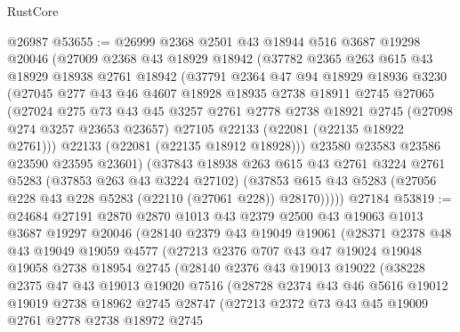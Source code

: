 \begin{lexlean}{RustCore}
\begin{coremodule}
    @26987
@53655 := @26999
    @2368
    @2501
    @43
    @18944
    @516
    @3687
    @19298
    @20046
    (@27009
      @2368
      @43
      @18929
      @18942
      (@37782
        @2365
        @263
        @615
        @43
        @18929
        @18938
        @2761
        @18942
        (@37791
          @2364
          @47
          @94
          @18929
          @18936
          @3230
          (@27045
            @277
            @43
            @46
            @4607
            @18928
            @18935
            @2738
            @18911
            @2745
            @27065
            (@27024
              @275
              @73
              @43
              @45
              @3257
              @2761
              @2778
              @2738
              @18921
              @2745
              (@27098 @274 @3257 @23653 @23657)
              @27105
              @22133
              (@22081 (@22135 @18922 @2761)))
            @22133
            (@22081 (@22135 @18912 @18928)))
          @23580
          @23583
          @23586
          @23590
          @23595
          @23601)
        (@37843
          @18938
          @263
          @615
          @43
          @2761
          @3224
          @2761
          @5283
          (@37853 @263 @43 @3224 @27102)
          (@37853 @615 @43 @5283 (@27056 @228 @43 @228 @5283 (@22110 (@27061 @228)) @28170)))))
    @27184
@53819 := @24684
    @27191
    @2870
    @2870
    @1013
    @43
    @2379
    @2500
    @43
    @19063
    @1013
    @3687
    @19297
    @20046
    (@28140
      @2379
      @43
      @19049
      @19061
      (@28371
        @2378
        @48
        @43
        @19049
        @19059
        @4577
        (@27213
          @2376
          @707
          @43
          @47
          @19024
          @19048
          @19058
          @2738
          @18954
          @2745
          (@28140
            @2376
            @43
            @19013
            @19022
            (@38228
              @2375
              @47
              @43
              @19013
              @19020
              @7516
              (@28728
                @2374
                @43
                @46
                @5616
                @19012
                @19019
                @2738
                @18962
                @2745
                @28747
                (@27213
                  @2372
                  @73
                  @43
                  @45
                  @19009
                  @2761
                  @2778
                  @2738
                  @18972
                  @2745

\end{coremodule}
\end{lexlean}

